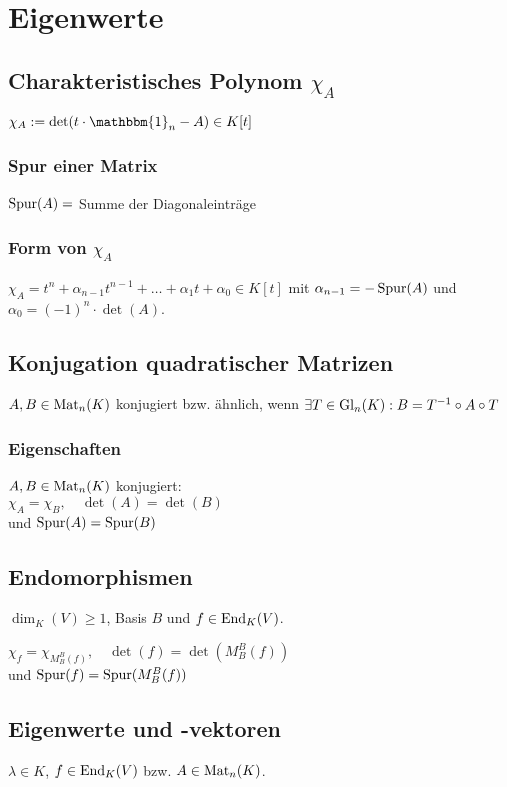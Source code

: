 \section*{Eigenwerte}

\subsection*{Charakteristisches Polynom $\chi_A$}
$\chi_A := \det(t\cdot\mathbbm{1}_n - A)\in K[t]$

\subsubsection*{Spur einer Matrix}
$\operatorname{Spur}(A)=$ Summe der Diagonaleinträge

\subsubsection*{Form von $\chi_A$}
$\chi_A=t^n + \alpha_{n-1}t^{n-1}+\dots+\alpha_1 t + \alpha_0 \in K[t]$
mit $\alpha_{n-1}=-\operatorname{Spur}(A)$ und $\alpha_0=(-1)^n\cdot\det(A)$.

\subsection*{Konjugation quadratischer Matrizen}
$A,B\in\operatorname{Mat}_n(K)$ konjugiert bzw. ähnlich, wenn
$\exists T\in\operatorname{Gl}_n(K): B=T^{-1}\circ A \circ T$

\subsubsection*{Eigenschaften}
$A,B\in\operatorname{Mat}_n(K)$ konjugiert: \\
$\chi_A=\chi_B,\quad \det(A)=\det(B)$ \\ und $\operatorname{Spur}(A)=\operatorname{Spur}(B)$

\subsection*{Endomorphismen}
$\dim_K(V) \ge 1$, Basis $B$ und $f\in\operatorname{End}_K(V)$.

$\chi_f = \chi_{M_B^B(f)},\quad \det(f)=\det(M_B^B(f))$\\
und $\operatorname{Spur}(f)=\operatorname{Spur}(M_B^B(f))$

\subsection*{Eigenwerte und -vektoren}
$\lambda \in K$, $f\in\operatorname{End}_K(V)$ bzw. $A\in\operatorname{Mat}_n(K)$.

